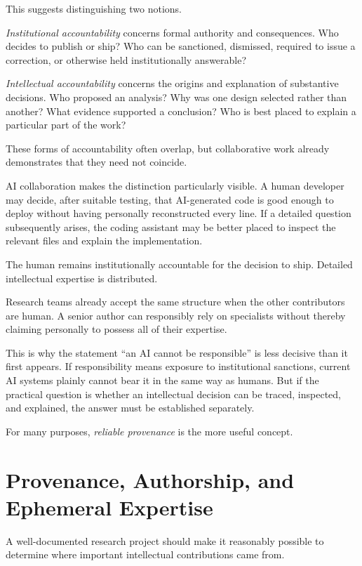 This suggests distinguishing two notions.

\emph{Institutional accountability} concerns formal authority and consequences. Who decides to publish or ship? Who can be sanctioned, dismissed, required to issue a correction, or otherwise held institutionally answerable?

\emph{Intellectual accountability} concerns the origins and explanation of substantive decisions. Who proposed an analysis? Why was one design selected rather than another? What evidence supported a conclusion? Who is best placed to explain a particular part of the work?

These forms of accountability often overlap, but collaborative work already demonstrates that they need not coincide.

AI collaboration makes the distinction particularly visible. A human developer may decide, after suitable testing, that AI-generated code is good enough to deploy without having personally reconstructed every line. If a detailed question subsequently arises, the coding assistant may be better placed to inspect the relevant files and explain the implementation.

The human remains institutionally accountable for the decision to ship. Detailed intellectual expertise is distributed.

Research teams already accept the same structure when the other contributors are human. A senior author can responsibly rely on specialists without thereby claiming personally to possess all of their expertise.

This is why the statement ``an AI cannot be responsible'' is less decisive than it first appears. If responsibility means exposure to institutional sanctions, current AI systems plainly cannot bear it in the same way as humans. But if the practical question is whether an intellectual decision can be traced, inspected, and explained, the answer must be established separately.

For many purposes, \emph{reliable provenance} is the more useful concept.


\section{Provenance, Authorship, and Ephemeral Expertise}

A well-documented research project should make it reasonably possible to determine where important intellectual contributions came from.

